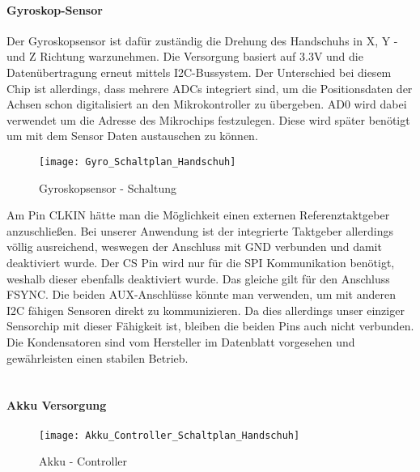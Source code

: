\documentclass[titlepage,12pt,twoside]{article}
\begin{document}
\paragraph{Gyroskop-Sensor}
\hfill \break
\hfill \break
Der Gyroskopsensor ist dafür zuständig die Drehung des Handschuhs in X, Y -und Z Richtung warzunehmen. Die Versorgung basiert 
auf 3.3V und die Datenübertragung erneut mittels I2C-Bussystem. Der Unterschied bei diesem Chip ist allerdings, dass mehrere ADCs
integriert sind, um die Positionsdaten der Achsen schon digitalisiert an den Mikrokontroller zu übergeben. AD0 wird dabei verwendet
um die Adresse des Mikrochips festzulegen. Diese wird später benötigt um mit dem Sensor Daten austauschen zu können.
\\
\begin{figure}[H]
	\begin{center}
		\scalebox{0.5}
		{\texttt{[image: Gyro\_Schaltplan\_Handschuh]}}
		\caption{Gyroskopsensor - Schaltung}
		\label{fig:Gyro_Schaltplan_Handschuh}		
	\end{center}
\end{figure}
\hfill \break
Am Pin CLKIN hätte man die Möglichkeit einen externen Referenztaktgeber anzuschließen. Bei unserer Anwendung ist der integrierte 
Taktgeber allerdings völlig ausreichend, weswegen der Anschluss mit GND verbunden und damit deaktiviert wurde. Der CS Pin wird nur
für die SPI Kommunikation benötigt, weshalb dieser ebenfalls deaktiviert wurde. Das gleiche gilt für den Anschluss FSYNC. Die beiden
AUX-Anschlüsse könnte man verwenden, um mit anderen I2C fähigen Sensoren direkt zu kommunizieren. Da dies allerdings unser einziger
Sensorchip mit dieser Fähigkeit ist, bleiben die beiden Pins auch nicht verbunden. Die Kondensatoren sind vom Hersteller im Datenblatt
vorgesehen und gewährleisten einen stabilen Betrieb. \\
\\
\paragraph{Akku Versorgung}
\hfill \break
\hfill \break
\begin{figure}[H]
	\begin{center}
		\scalebox{0.5}
		{\texttt{[image: Akku\_Controller\_Schaltplan\_Handschuh]}}
		\caption{Akku - Controller}
		\label{fig:Akku_Controller_Schaltplan_Handschuh}	
	\end{center}
\end{figure}
\end{document}
